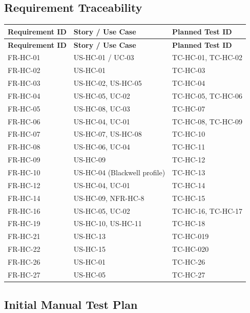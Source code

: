\documentclass[12pt,a4paper]{article}
\begin{document}
\subsection{Requirement Traceability}

\begin{longtable}{@{}L{3cm}L{4cm}L{4cm}@{}}
  
    \textbf{Requirement ID} & \textbf{Story / Use Case} & \textbf{Planned Test ID} \\
  \midrule
  \endfirsthead
  
    \textbf{Requirement ID} & \textbf{Story / Use Case} & \textbf{Planned Test ID} \\
  \midrule
  \endhead
  
  \endfoot

  FR-HC-01 & US-HC-01 / UC-03 & TC-HC-01, TC-HC-02 \\
    FR-HC-02 & US-HC-01 & TC-HC-03 \\
  FR-HC-03 & US-HC-02, US-HC-05 & TC-HC-04 \\
    FR-HC-04 & US-HC-05, UC-02 & TC-HC-05, TC-HC-06 \\
  FR-HC-05 & US-HC-08, UC-03 & TC-HC-07 \\
    FR-HC-06 & US-HC-04, UC-01 & TC-HC-08, TC-HC-09 \\
  FR-HC-07 & US-HC-07, US-HC-08 & TC-HC-10 \\
    FR-HC-08 & US-HC-06, UC-04 & TC-HC-11 \\
  FR-HC-09 & US-HC-09 & TC-HC-12 \\
    FR-HC-10 & US-HC-04 (Blackwell profile) & TC-HC-13 \\
  FR-HC-12 & US-HC-04, UC-01 & TC-HC-14 \\
    FR-HC-14 & US-HC-09, NFR-HC-8 & TC-HC-15 \\
  FR-HC-16 & US-HC-05, UC-02 & TC-HC-16, TC-HC-17 \\
    FR-HC-19 & US-HC-10, US-HC-11 & TC-HC-18 \\
  FR-HC-21 & US-HC-13 & TC-HC-019 \\
    FR-HC-22 & US-HC-15 & TC-HC-020 \\
  FR-HC-26 & US-HC-01 & TC-HC-26 \\
    FR-HC-27 & US-HC-05 & TC-HC-27 \\
\end{longtable}
\newpage
\subsection{Initial Manual Test Plan}
\end{document}
